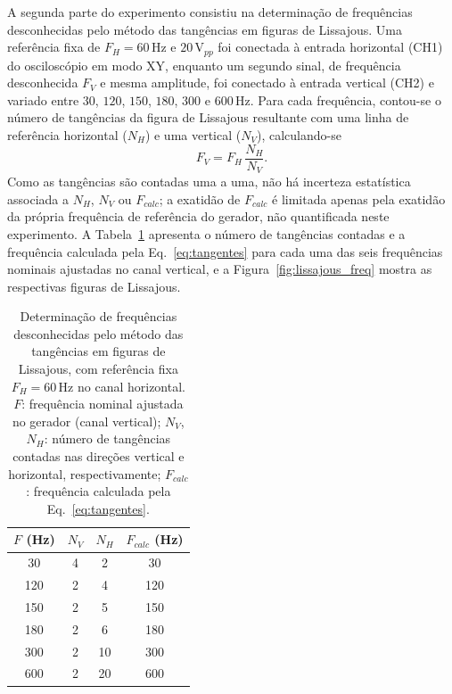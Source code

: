 \documentclass[reprint,amsmath,amssymb,aps,prl,floatfix,onecolumn]{revtex4-2}
\begin{document}
A segunda parte do experimento consistiu na determinação de frequências desconhecidas pelo método das tangências em figuras de Lissajous. Uma referência fixa de $F_H=60\,\text{Hz}$ e $20\,\text{V}_{pp}$ foi conectada à entrada horizontal (CH1) do osciloscópio em modo XY, enquanto um segundo sinal, de frequência desconhecida $F_V$ e mesma amplitude, foi conectado à entrada vertical (CH2) e variado entre $30$, $120$, $150$, $180$, $300$ e $600\,\text{Hz}$. Para cada frequência, contou-se o número de tangências da figura de Lissajous resultante com uma linha de referência horizontal ($N_H$) e uma vertical ($N_V$), calculando-se
\begin{equation}
	\label{eq:tangentes}
	F_V=F_H\,\frac{N_H}{N_V}.
\end{equation}
Como as tangências são contadas uma a uma, não há incerteza estatística associada a $N_H$, $N_V$ ou $F_{calc}$; a exatidão de $F_{calc}$ é limitada apenas pela exatidão da própria frequência de referência do gerador, não quantificada neste experimento. A Tabela~\ref{tab:freq} apresenta o número de tangências contadas e a frequência calculada pela Eq.~\eqref{eq:tangentes} para cada uma das seis frequências nominais ajustadas no canal vertical, e a Figura~\ref{fig:lissajous_freq} mostra as respectivas figuras de Lissajous.

\begin{table}[htb]
	\caption{\label{tab:freq} Determinação de frequências desconhecidas pelo método das tangências em figuras de Lissajous, com referência fixa $F_H=60\,\text{Hz}$ no canal horizontal. $F$: frequência nominal ajustada no gerador (canal vertical); $N_V$, $N_H$: número de tangências contadas nas direções vertical e horizontal, respectivamente; $F_{calc}$: frequência calculada pela Eq.~\eqref{eq:tangentes}.}
	\begin{tabular}{c|c|c|c}
		\hline\hline
		\textbf{$F$ (Hz)} & \textbf{$N_V$} & \textbf{$N_H$} & \textbf{$F_{calc}$ (Hz)} \\ \hline
		30  & 4 & 2  & 30  \\
		120 & 2 & 4  & 120 \\
		150 & 2 & 5  & 150 \\
		180 & 2 & 6  & 180 \\
		300 & 2 & 10 & 300 \\
		600 & 2 & 20 & 600 \\ \hline\hline
	\end{tabular}
\end{table}
\end{document}
